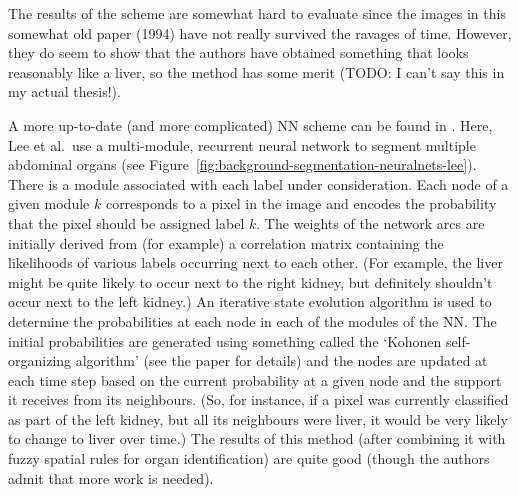 
The results of the scheme are somewhat hard to evaluate since the images in this somewhat old paper (1994) have not really survived the ravages of time. However, they do seem to show that the authors have obtained something that looks reasonably like a liver, so the method has some merit (TODO: I can't say this in my actual thesis!).

A more up-to-date (and more complicated) NN scheme can be found in \cite{lee03}. Here, Lee et al.\ use a multi-module, recurrent neural network to segment multiple abdominal organs (see Figure~\ref{fig:background-segmentation-neuralnets-lee}). There is a module associated with each label under consideration. Each node of a given module $k$ corresponds to a pixel in the image and encodes the probability that the pixel should be assigned label $k$. The weights of the network arcs are initially derived from (for example) a correlation matrix containing the likelihoods of various labels occurring next to each other. (For example, the liver might be quite likely to occur next to the right kidney, but definitely shouldn't occur next to the left kidney.) An iterative state evolution algorithm is used to determine the probabilities at each node in each of the modules of the NN. The initial probabilities are generated using something called the `Kohonen self-organizing algorithm' (see the paper for details) and the nodes are updated at each time step based on the current probability at a given node and the support it receives from its neighbours. (So, for instance, if a pixel was currently classified as part of the left kidney, but all its neighbours were liver, it would be very likely to change to liver over time.) The results of this method (after combining it with fuzzy spatial rules for organ identification) are quite good (though the authors admit that more work is needed).




